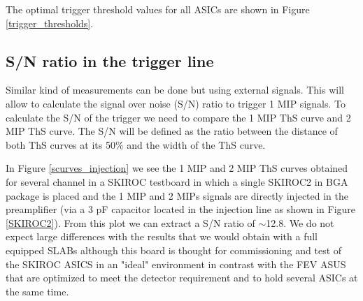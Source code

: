 \documentclass[final,3p,times,twocolumn]{elsarticle}
\begin{document}
The optimal trigger threshold values for all ASICs are shown in Figure \ref{trigger_thresholds}.


\subsection{S/N ratio in the trigger line}
\label{sec:comm_trigger_sn}

Similar kind of measurements can be done but using external signals. 
This will allow to calculate the signal over noise (S/N) ratio to trigger 1 MIP signals.
To calculate the S/N of the trigger we need to compare the 1 MIP ThS curve and 2 MIP ThS curve. The S/N 
will be defined as the ratio between the distance of both ThS curves at its 50\% and the width of the 
ThS curve.

In Figure \ref{scurves_injection} we see the 1 MIP and 2 MIP ThS curves obtained for several channel
in a SKIROC testboard in which a single SKIROC2 in BGA package is placed and the 1 MIP and 2 MIPs 
 signals are directly injected in the preamplifier 
(via a 3 pF capacitor located in the injection line as shown in Figure \ref{SKIROC2}). 
From this plot we can extract a S/N ratio of $\sim$12.8. 
We do not expect large differences with the results that we would obtain with 
a full equipped SLABs 
although this board is thought for commissioning and test of the SKIROC ASICS in an
"ideal" environment in contrast with the FEV
ASUS that are optimized to meet the detector requirement and to hold several ASICs at the same time.
\end{document}
